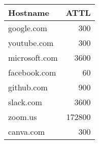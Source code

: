 \begin{tabular}{lr}
\toprule
Hostname & ATTL \\
\midrule
google.com & 300 \\
youtube.com & 300 \\
microsoft.com & 3600 \\
facebook.com & 60 \\
github.com & 900 \\
slack.com & 3600 \\
zoom.us & 172800 \\
canva.com & 300 \\
\bottomrule
\end{tabular}
